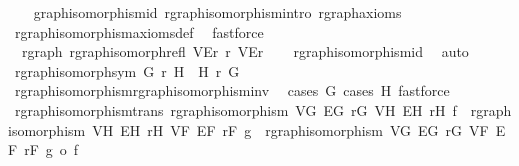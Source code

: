 \begin{isabellebody}
%
\isadelimproof
\ \ %
\endisadelimproof
%
\isatagproof
{}\isamarkupfalse%
\ graph{\isacharunderscore}{\kern0pt}isomorphism{\isacharunderscore}{\kern0pt}id\ rgraph{\isacharunderscore}{\kern0pt}isomorphism{\isachardot}{\kern0pt}intro\ rgraph{\isacharunderscore}{\kern0pt}axioms\isanewline
\ \ \isamarkupfalse%
\ rgraph{\isacharunderscore}{\kern0pt}isomorphism{\isacharunderscore}{\kern0pt}axioms{\isacharunderscore}{\kern0pt}def\ \isamarkupfalse%
\ fastforce%
\endisatagproof
{\isafoldproof}%
%
\isadelimproof
\isanewline
%
\endisadelimproof
\isanewline
{}\isamarkupfalse%
\ {\isacharparenleft}{\kern0pt}\ rgraph{\isacharparenright}{\kern0pt}\ rgraph{\isacharunderscore}{\kern0pt}isomorph{\isacharunderscore}{\kern0pt}refl{\isacharcolon}{\kern0pt}\ {\isachardoublequoteopen}{\isacharparenleft}{\kern0pt}V{\isacharcomma}{\kern0pt}E{\isacharcomma}{\kern0pt}r{\isacharparenright}{\kern0pt}\ {\isasymsimeq}\isactrlsub r\ {\isacharparenleft}{\kern0pt}V{\isacharcomma}{\kern0pt}E{\isacharcomma}{\kern0pt}r{\isacharparenright}{\kern0pt}{\isachardoublequoteclose}\isanewline
%
\isadelimproof
\ \ %
\endisadelimproof
%
\isatagproof
{}\isamarkupfalse%
\ rgraph{\isacharunderscore}{\kern0pt}isomorphism{\isacharunderscore}{\kern0pt}id\ \isamarkupfalse%
\ auto%
\endisatagproof
{\isafoldproof}%
%
\isadelimproof
\isanewline
%
\endisadelimproof
\isanewline
{}\isamarkupfalse%
\ rgraph{\isacharunderscore}{\kern0pt}isomorph{\isacharunderscore}{\kern0pt}sym{\isacharcolon}{\kern0pt}\ {\isachardoublequoteopen}G\ {\isasymsimeq}\isactrlsub r\ H\ {\isasymLongrightarrow}\ H\ {\isasymsimeq}\isactrlsub r\ G{\isachardoublequoteclose}\isanewline
%
\isadelimproof
\ \ %
\endisadelimproof
%
\isatagproof
{}\isamarkupfalse%
\ rgraph{\isacharunderscore}{\kern0pt}isomorphism{\isachardot}{\kern0pt}rgraph{\isacharunderscore}{\kern0pt}isomorphism{\isacharunderscore}{\kern0pt}inv\ \isamarkupfalse%
\ {\isacharparenleft}{\kern0pt}cases\ G{\isacharcomma}{\kern0pt}\ cases\ H{\isacharparenright}{\kern0pt}\ fastforce%
\endisatagproof
{\isafoldproof}%
%
\isadelimproof
\isanewline
%
\endisadelimproof
\isanewline
{}\isamarkupfalse%
\ rgraph{\isacharunderscore}{\kern0pt}isomorphism{\isacharunderscore}{\kern0pt}trans{\isacharcolon}{\kern0pt}\ {\isachardoublequoteopen}rgraph{\isacharunderscore}{\kern0pt}isomorphism\ V\isactrlsub G\ E\isactrlsub G\ r\isactrlsub G\ V\isactrlsub H\ E\isactrlsub H\ r\isactrlsub H\ f\ {\isasymLongrightarrow}\ rgraph{\isacharunderscore}{\kern0pt}isomorphism\ V\isactrlsub H\ E\isactrlsub H\ r\isactrlsub H\ V\isactrlsub F\ E\isactrlsub F\ r\isactrlsub F\ g\ {\isasymLongrightarrow}\ rgraph{\isacharunderscore}{\kern0pt}isomorphism\ V\isactrlsub G\ E\isactrlsub G\ r\isactrlsub G\ V\isactrlsub F\ E\isactrlsub F\ r\isactrlsub F\ {\isacharparenleft}{\kern0pt}g\ o\ f{\isacharparenright}{\kern0pt}{\isachardoublequoteclose}\isanewline

\end{isabellebody}
